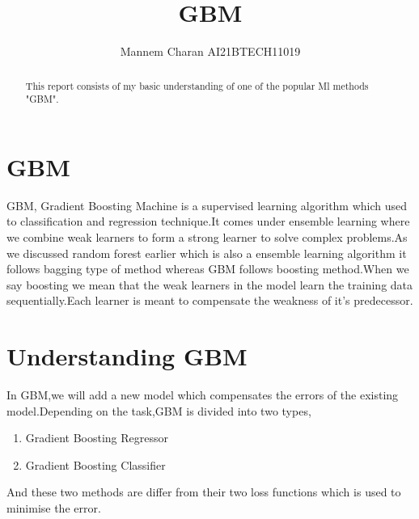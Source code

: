\documentclass[journal,12pt,onecolumn]{IEEEtran}
\theoremstyle{remark}
\numberwithin{equation}{section}
\begin{document}
		\title{GBM}
		\author{ Mannem Charan AI21BTECH11019}
		 \maketitle
		\begin{abstract}
			This report consists of my basic understanding of one of the popular Ml methods "GBM".
		\end{abstract}
		\section{GBM}
		 GBM, Gradient Boosting Machine is a supervised learning algorithm which used to classification and regression technique.It comes under ensemble learning where we combine weak learners to form a strong learner to solve complex problems.As we discussed random forest earlier which is also a ensemble learning algorithm it follows bagging type of method whereas GBM follows boosting method.When we say boosting we mean that the weak learners in the model learn the training data sequentially.Each learner is meant to compensate the weakness of it's predecessor.
		 \section{Understanding GBM}
		  In GBM,we will add a new model which compensates the errors of the existing model.Depending on the task,GBM is divided into two types,
		    \begin{enumerate}
		      \item Gradient Boosting Regressor
		      \item Gradient Boosting Classifier
	            \end{enumerate}
		And these two methods are differ from their two loss functions which is used to minimise the error.
\end{document}

